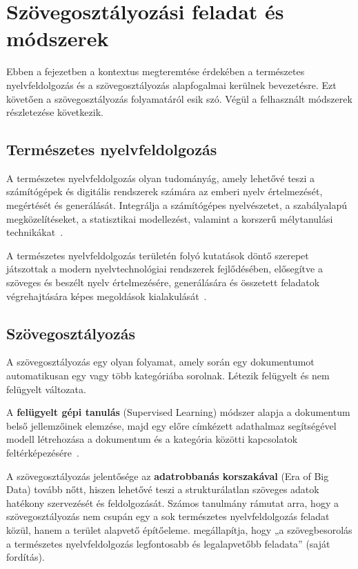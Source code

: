\chapter{Szövegosztályozási feladat és módszerek}

Ebben a fejezetben a kontextus megteremtése érdekében a természetes nyelvfeldolgozás és a szövegosztályozás alapfogalmai kerülnek bevezetésre. 
Ezt követően a szövegosztályozás folyamatáról esik szó. Végül a felhasznált módszerek részletezése következik.

\section{Természetes nyelvfeldolgozás}

A természetes nyelvfeldolgozás olyan tudományág, amely lehetővé teszi a számítógépek és digitális rendszerek számára az emberi nyelv értelmezését, 
megértését és generálását. Integrálja a számítógépes nyelvészetet, a szabályalapú megközelítéseket, a statisztikai modellezést, 
valamint a korszerű mélytanulási technikákat~\cite{ibmThinkNLP}.

A természetes nyelvfeldolgozás területén folyó kutatások döntő szerepet játszottak a modern nyelvtechnológiai rendszerek fejlődésében, 
elősegítve a szöveges és beszélt nyelv értelmezésére, generálására és összetett feladatok végrehajtására képes megoldások kialakulását~\cite{ibmThinkNLP}.

\section{Szövegosztályozás}

A szövegosztályozás egy olyan folyamat, amely során egy dokumentumot automatikusan egy vagy több kategóriába sorolnak. 
Létezik felügyelt és nem felügyelt változata.

A \textbf{felügyelt gépi tanulás} (Supervised Learning) módszer alapja a dokumentum belső jellemzőinek elemzése, 
majd egy előre címkézett adathalmaz segítségével modell létrehozása a dokumentum és a 
kategória közötti kapcsolatok feltérképezésére~\cite{wang2023textclassificationnlp}.

A szövegosztályozás jelentősége az \textbf{adatrobbanás korszakával} (Era of Big Data) tovább nőtt, 
hiszen lehetővé teszi a strukturálatlan szöveges adatok hatékony szervezését és feldolgozását. Számos tanulmány rámutat arra, 
hogy a szövegosztályozás nem csupán egy a sok természetes nyelvfeldolgozás feladat közül, 
hanem a terület alapvető építőeleme. \cite{li2022surveytextclassification} megállapítja, hogy „a szövegbesorolás a természetes nyelvfeldolgozás legfontosabb és legalapvetőbb feladata” (saját fordítás).

